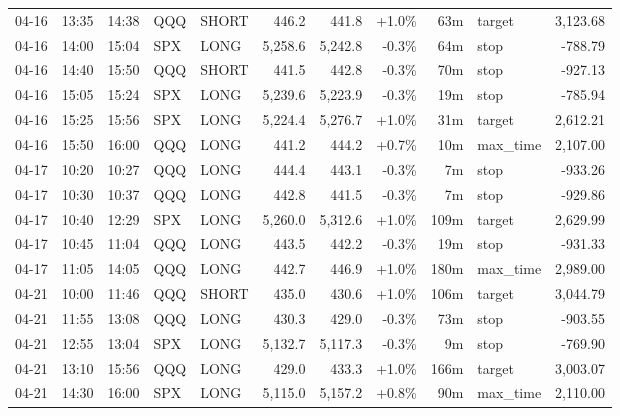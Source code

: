 \documentclass[11pt,a4paper,twoside]{article}
\begin{document}
\begin{center}
\begin{longtable}{>{\color{txtmain}}l l l l l r r r r >{\color{txtmain}}l r}
04-16 & 13:35 & 14:38 & QQQ & SHORT & 446.2 & 441.8 & \textcolor{wingreen}{+1.0\%} & 63m & target & \textcolor{wingreen}{3,123.68} \\
04-16 & 14:00 & 15:04 & SPX & LONG & 5,258.6 & 5,242.8 & \textcolor{lossred}{-0.3\%} & 64m & stop & \textcolor{lossred}{-788.79} \\
04-16 & 14:40 & 15:50 & QQQ & SHORT & 441.5 & 442.8 & \textcolor{lossred}{-0.3\%} & 70m & stop & \textcolor{lossred}{-927.13} \\
04-16 & 15:05 & 15:24 & SPX & LONG & 5,239.6 & 5,223.9 & \textcolor{lossred}{-0.3\%} & 19m & stop & \textcolor{lossred}{-785.94} \\
04-16 & 15:25 & 15:56 & SPX & LONG & 5,224.4 & 5,276.7 & \textcolor{wingreen}{+1.0\%} & 31m & target & \textcolor{wingreen}{2,612.21} \\
04-16 & 15:50 & 16:00 & QQQ & LONG & 441.2 & 444.2 & \textcolor{wingreen}{+0.7\%} & 10m & max\_time & \textcolor{wingreen}{2,107.00} \\
04-17 & 10:20 & 10:27 & QQQ & LONG & 444.4 & 443.1 & \textcolor{lossred}{-0.3\%} & 7m & stop & \textcolor{lossred}{-933.26} \\
04-17 & 10:30 & 10:37 & QQQ & LONG & 442.8 & 441.5 & \textcolor{lossred}{-0.3\%} & 7m & stop & \textcolor{lossred}{-929.86} \\
04-17 & 10:40 & 12:29 & SPX & LONG & 5,260.0 & 5,312.6 & \textcolor{wingreen}{+1.0\%} & 109m & target & \textcolor{wingreen}{2,629.99} \\
04-17 & 10:45 & 11:04 & QQQ & LONG & 443.5 & 442.2 & \textcolor{lossred}{-0.3\%} & 19m & stop & \textcolor{lossred}{-931.33} \\
04-17 & 11:05 & 14:05 & QQQ & LONG & 442.7 & 446.9 & \textcolor{wingreen}{+1.0\%} & 180m & max\_time & \textcolor{wingreen}{2,989.00} \\
04-21 & 10:00 & 11:46 & QQQ & SHORT & 435.0 & 430.6 & \textcolor{wingreen}{+1.0\%} & 106m & target & \textcolor{wingreen}{3,044.79} \\
04-21 & 11:55 & 13:08 & QQQ & LONG & 430.3 & 429.0 & \textcolor{lossred}{-0.3\%} & 73m & stop & \textcolor{lossred}{-903.55} \\
04-21 & 12:55 & 13:04 & SPX & LONG & 5,132.7 & 5,117.3 & \textcolor{lossred}{-0.3\%} & 9m & stop & \textcolor{lossred}{-769.90} \\
04-21 & 13:10 & 15:56 & QQQ & LONG & 429.0 & 433.3 & \textcolor{wingreen}{+1.0\%} & 166m & target & \textcolor{wingreen}{3,003.07} \\
04-21 & 14:30 & 16:00 & SPX & LONG & 5,115.0 & 5,157.2 & \textcolor{wingreen}{+0.8\%} & 90m & max\_time & \textcolor{wingreen}{2,110.00} \\

\end{longtable}
\end{center}
\end{document}
